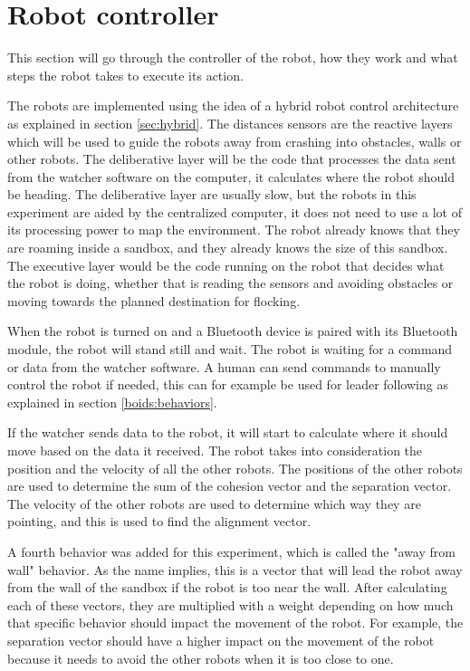 \section{Robot controller}
\label{sec:robotcontroller}
This section will go through the controller of the robot, how they work and what steps the robot takes to execute its action.

The robots are implemented using the idea of a hybrid robot control architecture as explained in section \ref{sec:hybrid}. The distances sensors are the reactive layers which will be used to guide the robots away from crashing into obstacles, walls or other robots. The deliberative layer will be the code that processes the data sent from the watcher software on the computer, it calculates where the robot should be heading. The deliberative layer are usually slow, but the robots in this experiment are aided by the centralized computer, it does not need to use a lot of its processing power to map the environment. The robot already knows that they are roaming inside a sandbox, and they already knows the size of this sandbox.
The executive layer would be the code running on the robot that decides what the robot is doing, whether that is reading the sensors and avoiding obstacles or moving towards the planned destination for flocking.

When the robot is turned on and a Bluetooth device is paired with its Bluetooth module, the robot will stand still and wait. The robot is waiting for a command or data from the watcher software. A human can send commands to manually control the robot if needed, this can for example be used for leader following as explained in section \ref{boids:behaviors}. 

If the watcher sends data to the robot, it will start to calculate where it should move based on the data it received. 
The robot takes into consideration the position and the velocity of all the other robots. The positions of the other robots are used to determine the sum of the cohesion vector and the separation vector. The velocity of the other robots are used to determine which way they are pointing, and this is used to find the alignment vector.

A fourth behavior was added for this experiment, which is called the "away from wall" behavior. As the name implies, this is a vector that will lead the robot away from the wall of the sandbox if the robot is too near the wall. After calculating each of these vectors, they are multiplied with a weight depending on how much that specific behavior should impact the movement of the robot. For example, the separation vector should have a higher impact on the movement of the robot because it needs to avoid the other robots when it is too close to one. 

